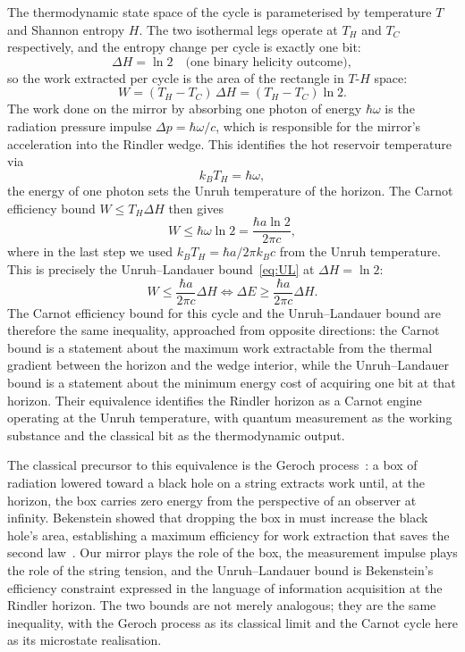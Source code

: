 The thermodynamic state space of the cycle is parameterised 
by temperature $T$ and Shannon entropy $H$. The two 
isothermal legs operate at $T_H$ and $T_C$ respectively, 
and the entropy change per cycle is exactly one bit:
%
\begin{equation}
\Delta H = \ln 2 \quad \text{(one binary helicity outcome)},
\end{equation}
%
so the work extracted per cycle is the area of the rectangle 
in $T$-$H$ space:
%
\begin{equation}
W = (T_H - T_C)\,\Delta H = (T_H - T_C)\ln 2.
\label{eq:carnot_work}
\end{equation}
%
The work done on the mirror by absorbing one photon of energy 
$\hbar\omega$ is the radiation pressure impulse $\Delta p = 
\hbar\omega/c$, which is responsible for the mirror's 
acceleration into the Rindler wedge. This identifies the hot 
reservoir temperature via
%
\begin{equation}
k_BT_H = \hbar\omega,
\label{eq:TH}
\end{equation}
%
the energy of one photon sets the Unruh temperature of the 
horizon. The Carnot efficiency bound $W \leq T_H\Delta H$ 
then gives
%
\begin{equation}
W \leq \hbar\omega\ln 2 = \frac{\hbar a \ln 2}{2\pi c},
\label{eq:carnot_bound}
\end{equation}
%
where in the last step we used $k_BT_H = \hbar a/2\pi k_Bc$ 
from the Unruh temperature. This is precisely the 
Unruh--Landauer bound~\eqref{eq:UL} at $\Delta H = \ln 2$:
%
\begin{equation}
\boxed{W \leq \frac{\hbar a}{2\pi c}\Delta H 
\iff \Delta E \geq \frac{\hbar a}{2\pi c}\Delta H.}
\label{eq:carnot_UL}
\end{equation}
%
The Carnot efficiency bound for this cycle and the 
Unruh--Landauer bound are therefore the same inequality, 
approached from opposite directions: the Carnot bound is a 
statement about the maximum work extractable from the thermal 
gradient between the horizon and the wedge interior, while 
the Unruh--Landauer bound is a statement about the minimum 
energy cost of acquiring one bit at that horizon. Their 
equivalence identifies the Rindler horizon as a Carnot engine 
operating at the Unruh temperature, with quantum measurement 
as the working substance and the classical bit as the 
thermodynamic output.

The classical precursor to this equivalence is the 
Geroch process~\cite{bekenstein}: a box of radiation 
lowered toward a black hole on a string extracts work 
until, at the horizon, the box carries zero energy 
from the perspective of an observer at infinity. 
Bekenstein showed that dropping the box in must 
increase the black hole's area, establishing a maximum 
efficiency for work extraction that saves the second 
law~\cite{bekenstein}. Our mirror plays the role of 
the box, the measurement impulse plays the role of 
the string tension, and the Unruh--Landauer bound is 
Bekenstein's efficiency constraint expressed in the 
language of information acquisition at the Rindler 
horizon. The two bounds are not merely analogous; 
they are the same inequality, with the Geroch process 
as its classical limit and the Carnot cycle here as 
its microstate realisation.

